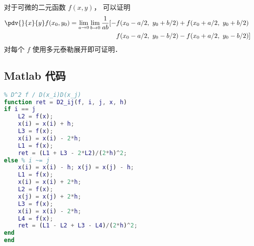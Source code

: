 
\begin{issues}
\issueDraft
\end{issues}


对于可微的二元函数 $f(x,y)$， 可以证明
\begin{equation}
\begin{aligned}
\pdv{}{x}{y} f(x_0,y_0) = \lim_{a\to 0}\lim_{b\to 0}\frac{1}{ab}[-& f(x_0-a/2,\ y_0+b/2) + f(x_0+a/2,\  y_0+b/2)\\
& f(x_0-a/2,\  y_0-b/2) - f(x_0+a/2,\  y_0-b/2)]
\end{aligned}
\end{equation}
对每个 $f$ 使用多元泰勒展开即可证明．

\subsection{Matlab 代码}
\begin{lstlisting}[language=matlab, caption=D2\_ij.m]
% 数值二阶偏导
% D^2 f / D(x_i)D(x_j)
function ret = D2_ij(f, i, j, x, h)
if i == j
    L2 = f(x);
    x(i) = x(i) + h;
    L3 = f(x);
    x(i) = x(i) - 2*h;
    L1 = f(x);
    ret = (L1 + L3 - 2*L2)/(2*h)^2;
else % i ~= j
    x(i) = x(i) - h; x(j) = x(j) - h;
    L1 = f(x);
    x(i) = x(i) + 2*h;
    L2 = f(x);
    x(j) = x(j) + 2*h;
    L3 = f(x);
    x(i) = x(i) - 2*h;
    L4 = f(x);
    ret = (L1 - L2 + L3 - L4)/(2*h)^2;
end
end
\end{lstlisting}
